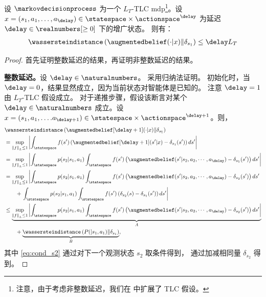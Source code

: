 \begin{prop}
\label{pp:tlc_delay}
    设 $\markovdecisionprocess$ 为一个 $L_T$-TLC \gls{mdp}\footnote{注意，由于考虑非整数延迟，我们在  中扩展了 TLC 假设。}。设 $x=(s_1,a_1,\dots,a_\delay)\in\statespace\times\actionspace^\delay$ 为延迟 $\delay\in\realnumbers[\ge0]$ 下的增广状态。
    则有：
    \begin{align*}
        \wassersteindistance\left(\augmentedbelief(\cdot\vert x)\Vert \delta_{s_1} \right)\leq \delay L_T
    \end{align*}
\end{prop}
\begin{proof}
    首先证明整数延迟的结果，再证明非整数延迟的结果。

    \noindent\textbf{整数延迟。}\indent 设 $\delay\in\naturalnumbers$。
    采用归纳法证明。
    初始化时，当 $\delay=0$，结果显然成立，因为当前状态对智能体是已知的。
    注意 $\delay=1$ 由 $L_T$-TLC 假设成立。
    对于递推步骤，假设该断言对某个 $\delay \in\naturalnumbers$ 成立。设 $x=(s_1,a_1,\dots.a_{\delay+1})\in\statespace\times\actionspace^{\delay+1}$。则，
    \begin{align}
        &\wassersteindistance\left(\augmentedbelief[\delay+1](\cdot\vert x)\Vert \delta_{s_1} \right)
        \\
        &= \sup_{\left\Vert f\right\Vert_L\leq 1}\left\vert\int_{\statespace} f(s')\left( \augmentedbelief[\delay+1](s' \vert x) -\delta_{s_1}(s')\right)ds' \right\vert\nonumber
        \\
        &= \sup_{\left\Vert f\right\Vert_L\leq 1}\left\vert\int_{\statespace} p(s_2\vert s_1,a_1) \int_{\statespace} f(s')\left( \augmentedbelief(s' \vert s_2,a_2,\cdots,a_\delay) -\delta_{s_1}(s')\right)ds' \right\vert
        \label{eq:cond_s2}
        \\
        &= \sup_{\left\Vert f\right\Vert_L\leq 1}\left\vert\int_{\statespace} p(s_2\vert s_1,a_1) \int_{\statespace} f(s')\left( \augmentedbelief(s' \vert s_2,a_2,\cdots,a_\delay) -\delta_{s_2}(s')\right)ds' \right.\nonumber
        \\
        &\qquad + \left.\int_{\statespace} p(s_2\vert s_1,a_1) \int_{\statespace} f(s')\left( \delta_{s_2}(s) -\delta_{s_1}(s')\right)ds' \right\vert
        \label{eq:add_remove_delta}
        \\
        &\leq \underbrace{\sup_{\left\Vert f\right\Vert_L\leq 1}\left\vert\int_{\statespace} p(s_2\vert s_1,a_1) \int_{\statespace} f(s')\left( \augmentedbelief(s' \vert s_2,a_2,\cdots,a_\delay) -\delta_{s_2}(s')\right)ds'  \right\vert}_A\nonumber
        \\
        &\qquad + \underbrace{\wassersteindistance\left(P(\vert s_1,a_1)\Vert \delta_{s_1}\right)}_B
        \nonumber,
    \end{align}
    其中 \eqref{eq:cond_s2} 通过对下一个观测状态 $s_2$ 取条件得到， 通过加减相同量 $\delta_{s_2}$ 得到。


\end{proof}
